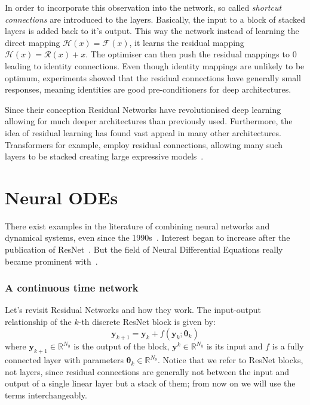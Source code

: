 \documentclass[11pt]{report}
\begin{document}
    In order to incorporate this observation into the network, so called \textit{shortcut connections} are introduced to the layers.
    Basically, the input to a block of stacked layers is added back to it's output.
    This way the network instead of learning the direct mapping $\mathcal{H}(x) = \mathcal{F}(x)$, it learns the residual mapping $\mathcal{H}(x) = \mathcal{R}(x)+x$.
    The optimiser can then push the residual mappings to $0$ leading to identity connections.
    Even though identity mappings are unlikely to be optimum, experiments showed that the residual connections have generally small responses, meaning identities are good pre-conditioners for deep architectures.

    Since their conception Residual Networks have revolutionised deep learning allowing for much deeper architectures than previously used.
    Furthermore, the idea of residual learning has found vast appeal in many other architectures.
    Transformers for example, employ residual connections, allowing many such layers to be stacked creating large expressive models~\cite{vaswani2017attention}.


    \chapter{Neural ODEs}
    There exist examples in the literature of combining neural networks and dynamical systems, even since the 1990s~\cite{rico1992discrete}.
    Interest began to increase after the publication of ResNet~\cite{weinan2018mean}.
    But the field of Neural Differential Equations really became prominent with~\cite{chen2018neural}.

    \subsection{A continuous time network}
    Let's revisit Residual Networks and how they work.
    The input-output relationship of the $k$-th discrete ResNet block is given by:
    \begin{equation}
        \pmb{y}_{k+1} = \pmb{y}_{k} + f(\pmb{y}_{k}; \pmb{\theta}_k) \label{resnet}
    \end{equation}
    where $\pmb{y}_{k+1} \in \mathbb{R}^{N_y}$ is the output of the block, $\pmb{y}^{k} \in \mathbb{R}^{N_y}$ is its input and $f$ is a fully connected layer with parameters $\pmb{\theta}_k \in \mathbb{R}^{N_\theta}$.
    Notice that we refer to ResNet blocks, not layers, since residual connections are generally not between the input and output of a single linear layer but a stack of them; from now on we will use the terms interchangeably.
\end{document}
